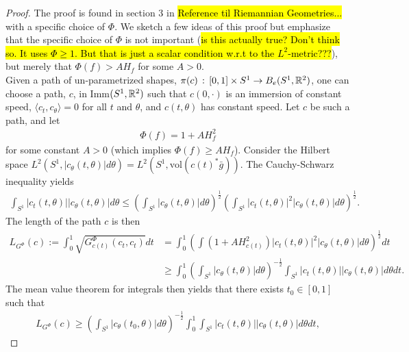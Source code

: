 \begin{proof}
The proof is found in section 3 in \hl{Reference til  Riemannian Geometries...} with a specific choice of $\Phi$. We sketch a few ideas of this proof but emphasize that the specific choice of $\Phi$ is not important (\hl{is this actually true? Don't think so. It uses $\Phi \geq 1$. But that is just a scalar condition w.r.t to the $L^2$-metric???}), but merely that $\Phi(f) > AH_f$ for some $A > 0$. \\[0.2 cm]
Given a path of un-parametrized shapes, $\pi(c) \, : \, [0,1] \times S^1 \rightarrow B_e(S^1, \mathbb{R}^2)$, one can choose a path, $c$, in Imm$(S^1, \mathbb{R}^2)$ such that $c(0, \cdot)$ is an immersion of constant speed, $\langle c_t, c_\theta \rangle = 0$ for all $t$ and $\theta$, and $c(t , \theta)$ has constant speed. Let $c$ be such a path, and let
\begin{align*}
\Phi(f) = 1 + A H_f ^2
\end{align*}  
for some constant $A > 0$ (which implies $\Phi(f) \geq AH_f$). Consider the Hilbert space $L^2(S^1, \left| c_\theta(t, \theta) \right| d\theta) = L^2(S^1, \text{vol} (c(t)^* \bar{g}))$. The Cauchy-Schwarz inequality yields
\begin{align*}
\int_{S^1} \left| c_t(t, \theta) \right| \left| c_\theta(t, \theta) \right| d \theta \leq \left(\int_{S^1} \left| c_\theta(t, \theta) \right| d \theta \right) ^{\frac{1}{2}} \left( \int_{S^1} \left| c_t(t, \theta) \right|^2 \left| c_\theta(t, \theta) \right| d \theta   \right) ^{\frac{1}{2}}.
\end{align*} 
The length of the path $c$ is then
\begin{align*}
L_{G^{\Phi}}(c) := \int_0^1  \sqrt{G^{\Phi}_{c(t)}(c_t, c_t)} dt &= \int_0^1 \left( \int (1 + AH_{c(t)}^2 ) \left| c_t(t, \theta) \right|^2 \left| c_\theta(t, \theta) \right| d\theta     \right) ^{\frac{1}{2}} dt \\
& \geq \int_0^1 \left(\int_{S^1} \left| c_\theta(t, \theta) \right| d \theta \right) ^{-\frac{1}{2}} \int_{S^1} \left| c_t(t, \theta) \right| \left| c_\theta(t, \theta) \right| d \theta dt.
\end{align*}
The mean value theorem for integrals then yields that there exists $t_0 \in [0, 1]$ such that
\begin{align*}
L_{G^{\Phi}}(c)\geq  \left(\int_{S^1} \left| c_\theta(t_0, \theta) \right| d \theta \right) ^{-\frac{1}{2}} \int_0^1 \int_{S^1} \left| c_t(t, \theta) \right| \left| c_\theta(t, \theta) \right| d \theta dt,
\end{align*}

\end{proof}

